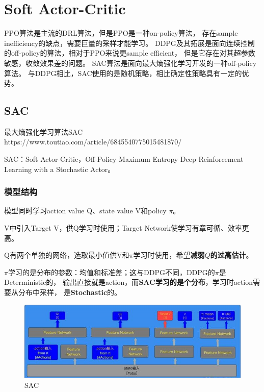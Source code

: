 ﻿\chapter{Soft Actor-Critic}


PPO算法是主流的DRL算法，但是PPO是一种on-policy算法，
存在sample inefficiency的缺点，需要巨量的采样才能学习。
DDPG及其拓展是面向连续控制的off-policy的算法，相对于PPO来说更sample efficient，
但是它存在对其超参数敏感，收敛效果差的问题。
SAC算法是面向最大熵强化学习开发的一种off-policy算法。
与DDPG相比，SAC使用的是随机策略，相比确定性策略具有一定的优势。


\section{SAC}

\noindent 最大熵强化学习算法SAC \\
https://www.toutiao.com/article/6845540775015481870/

SAC：Soft Actor-Critic，Off-Policy Maximum Entropy Deep Reinforcement 
Learning with a Stochastic Actor。


\subsection{模型结构}

模型同时学习action value Q、state value V和policy $\pi$。

V中引入Target V，供Q学习时使用；Target Network使学习有章可循、效率更高。

Q有两个单独的网络，选取最小值供V和$\pi$学习时使用，希望{\bf 减弱$Q$的过高估计}。

$\pi$学习的是分布的参数：均值和标准差；这与DDPG不同，DDPG的$\pi$是Deterministic的，
输出直接就是action，而{\bf SAC学习的是个分布}，学习时action需要从分布中采样，
是{\bf Stochastic}的。

\begin{figure}[ht]
\centering
\includegraphics[scale=1.0]{pix/sac.jpg}
\caption{SAC}
\end{figure}


